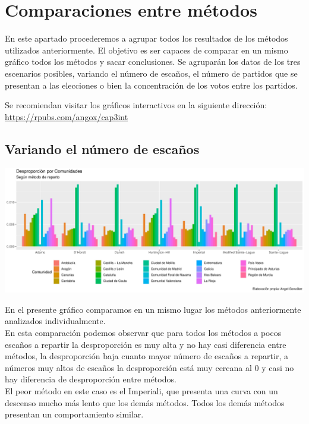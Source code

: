 \documentclass[12pt,a4paper,]{book}
\numberwithin{dummy}{section}
\theoremstyle{ocrenumbox}
\theoremstyle{blacknumex}
\theoremstyle{blacknumbox}
\theoremstyle{ocrenum}
\theoremstyle{ocrenum}
\begin{document}
\hypertarget{comparaciones-entre-muxe9todos}{%
\section{Comparaciones entre
métodos}\label{comparaciones-entre-muxe9todos}}

En este apartado procederemos a agrupar todos los resultados de los
métodos utilizados anteriormente. El objetivo es ser capaces de comparar
en un mismo gráfico todos los métodos y sacar conclusiones. Se agruparán
los datos de los tres escenarios posibles, variando el número de
escaños, el número de partidos que se presentan a las elecciones o bien
la concentración de los votos entre los partidos.

Se recomiendan visitar los gráficos interactivos en la siguiente
dirección: \url{https://rpubs.com/angox/cap3int}

\hypertarget{variando-el-nuxfamero-de-escauxf1os}{%
\subsection{Variando el número de
escaños}\label{variando-el-nuxfamero-de-escauxf1os}}

\begin{center}\includegraphics[width=0.95\linewidth]{figurasR/unnamed-chunk-66-1} \end{center}

En el presente gráfico comparamos en un mismo lugar los métodos
anteriormente analizados individualmente.\\
En esta comparación podemos observar que para todos los métodos a pocos
escaños a repartir la desproporción es muy alta y no hay casi diferencia
entre métodos, la desproporción baja cuanto mayor número de escaños a
repartir, a números muy altos de escaños la desproporción está muy
cercana al 0 y casi no hay diferencia de desproporción entre métodos.\\
El peor método en este caso es el Imperiali, que presenta una curva con
un descenso mucho más lento que los demás métodos. Todos los demás
métodos presentan un comportamiento similar.
\end{document}
